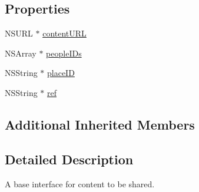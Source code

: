\subsection*{Properties}
\begin{DoxyCompactItemize}
\item 
N\-S\-U\-R\-L $\ast$ \hyperlink{protocol_f_b_s_d_k_sharing_content-p_af1a334ad35323e1f865fd46b6c30f0c8}{content\-U\-R\-L}
\item 
N\-S\-Array $\ast$ \hyperlink{protocol_f_b_s_d_k_sharing_content-p_a07031f755deb87e88a8c0765c9d6651d}{people\-I\-Ds}
\item 
N\-S\-String $\ast$ \hyperlink{protocol_f_b_s_d_k_sharing_content-p_a8af542b311e24d38c73221d81d250399}{place\-I\-D}
\item 
N\-S\-String $\ast$ \hyperlink{protocol_f_b_s_d_k_sharing_content-p_a5ea294c3c5b2fd923d00ea95fc19a20d}{ref}
\end{DoxyCompactItemize}
\subsection*{Additional Inherited Members}


\subsection{Detailed Description}
A base interface for content to be shared. 

